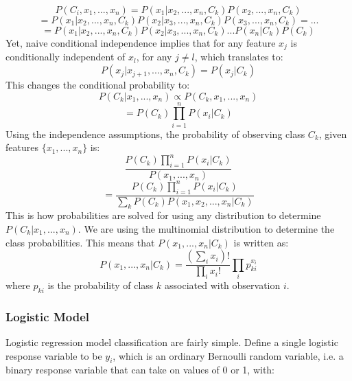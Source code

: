 \documentclass[titlepage, 12pt]{article}
\begin{document}
\begin{equation}
    P(C_i, x_1, ..., x_n) = P(x_1|x_2, ...,x_n, C_k) P(x_2,...,x_n, C_k)
\end{equation}
\begin{equation}
    =P(x_1|x_2, ..., x_n, C_k)P(x_2|x_3, ..., x_n, C_k)P(x_3, ..., x_n, C_k)=...
\end{equation}
\begin{equation}
    =P(x_1|x_2,..., x_n, C_k)P(x_2|x_3,..., x_n, C_k) ...P(x_n|C_k)P(C_k)
\end{equation}
Yet, naive conditional independence implies that for any feature $x_j$ is conditionally independent of $x_l$, for any $j \neq l$, which translates to:
\begin{equation}
    P(x_j| x_{j+1}, ..., x_n, C_k) = P(x_j|C_k)
\end{equation}
This changes the conditional probability to:
\begin{equation}
    P(C_k|x_1, ..., x_n) \propto P(C_k, x_1, ..., x_n)
\end{equation}
\begin{equation}
    =P(C_k) \prod_{i=1}^{n} P(x_i|C_k)
\end{equation}
Using the independence assumptions, the probability of observing class $C_k$, given features $\{x_1, ..., x_n\}$ is:
\begin{equation}
    \frac{P(C_k) \prod_{i=1}^{n} P(x_i|C_k)}{P(x_1, ..., x_n)}
\end{equation}
\begin{equation}
    =\frac{P(C_k) \prod_{i=1}^{n} P(x_i|C_k)}{\sum_{k}P(C_k)P(x_1, x_2,..., x_n|C_k)}
\end{equation}
\hspace{0.5 cm}This is how probabilities are solved for using any distribution to determine $P(C_k|x_1, ..., x_n)$. We are using the multinomial distribution to determine the class probabilities. This means that $P(x_1, ..., x_n|C_k)$ is written as:
\begin{equation}
    P(x_1, ..., x_n|C_k) = \frac{(\sum_i x_i)!}{\prod_i x_i!}\prod_i p_{ki}^{x_i}
\end{equation}
where $p_{ki}$ is the probability of class $k$ associated with observation $i$.

\subsubsection{Logistic Model}
\hspace{0.5 cm}Logistic regression model classification are fairly simple. Define a single logistic response variable to be $y_i$, which is an ordinary Bernoulli random variable, i.e. a binary response variable that can take on values of 0 or 1, with:
\end{document}
